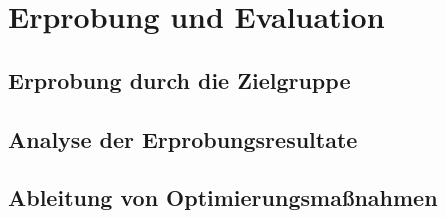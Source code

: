 \chapter{Erprobung und Evaluation}
\section{Erprobung durch die Zielgruppe}
\section{Analyse der Erprobungsresultate}
\section{Ableitung von Optimierungsmaßnahmen}


